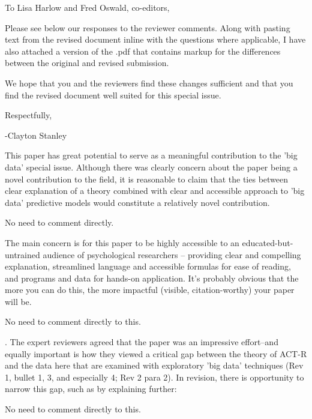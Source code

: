 \documentclass[answers,12pt]{exam}
\begin{document}
To Lisa	Harlow and Fred	Oswald,	co-editors, \bigskip

Please see below our responses to the reviewer comments.
Along with pasting text from the revised document inline with the questions where applicable,
I have also attached a version of the .pdf that contains markup for the differences between the original and revised submission. \bigskip 

We hope that you and the reviewers find these changes sufficient and that you find the revised document well suited for this special issue. \bigskip

Respectfully,

-Clayton Stanley

\bigskip
\bigskip

\begin{questions}

\question This paper has great potential to serve as a meaningful contribution to the 'big data' special issue. Although there was clearly concern about the paper being a novel contribution to the field, it is reasonable to claim that the ties between clear explanation of a theory combined with clear and accessible approach to 'big data' predictive models would constitute a relatively novel contribution.

\begin{solution}
No need to comment directly.
\end{solution}

\question The main concern is for this paper to be highly accessible to an educated-but-untrained audience of psychological researchers -- providing clear and compelling explanation, streamlined language and accessible formulas for ease of reading, and programs and data for hands-on application. It's probably obvious that the more you can do this, the more impactful (visible, citation-worthy) your paper will be.

\begin{solution}
No need to comment directly to this.
\end{solution}

. The expert reviewers agreed that the paper was an impressive effort--and equally important is how they viewed a critical gap between the theory of ACT-R and the data here that are examined with exploratory 'big data' techniques (Rev 1, bullet 1, 3, and especially 4; Rev 2 para 2). In revision, there is opportunity to narrow this gap, such as by explaining further:

\begin{solution}
No need to comment directly to this.
\end{solution}


\end{questions}
\end{document}
